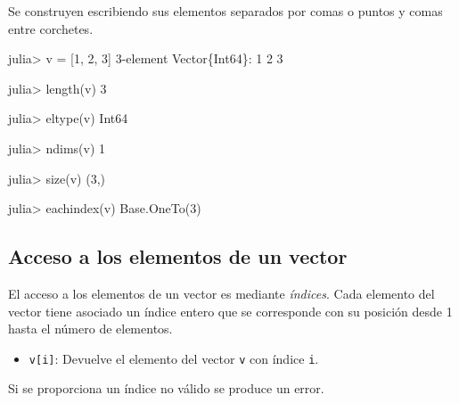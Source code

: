 \documentclass[
  letterpaper,
  DIV=11,
  numbers=noendperiod]{scrreprt}
\newenvironment{Shaded}{\begin{snugshade}}{\end{snugshade}}
\newcommand{\BuiltInTok}[1]{\textcolor[rgb]{0.00,0.23,0.31}{#1}}
\newcommand{\DataTypeTok}[1]{\textcolor[rgb]{0.68,0.00,0.00}{#1}}
\newcommand{\FloatTok}[1]{\textcolor[rgb]{0.68,0.00,0.00}{#1}}
\newcommand{\FunctionTok}[1]{\textcolor[rgb]{0.28,0.35,0.67}{#1}}
\newcommand{\NormalTok}[1]{\textcolor[rgb]{0.00,0.23,0.31}{#1}}
\newcommand{\OperatorTok}[1]{\textcolor[rgb]{0.37,0.37,0.37}{#1}}
\providecommand{\tightlist}{%
  \setlength{\itemsep}{0pt}\setlength{\parskip}{0pt}}\usepackage{longtable,booktabs,array}
\begin{document}
Se construyen escribiendo sus elementos separados por comas o puntos y
comas entre corchetes.

\begin{Shaded}
\begin{Highlighting}[]
\NormalTok{julia}\OperatorTok{\textgreater{}}\NormalTok{ v }\OperatorTok{=}\NormalTok{ [}\FloatTok{1}\NormalTok{, }\FloatTok{2}\NormalTok{, }\FloatTok{3}\NormalTok{]}
\FloatTok{3}\OperatorTok{{-}}\NormalTok{element }\DataTypeTok{Vector}\NormalTok{\{}\DataTypeTok{Int64}\NormalTok{\}}\OperatorTok{:}
 \FloatTok{1}
 \FloatTok{2}
 \FloatTok{3}

\NormalTok{julia}\OperatorTok{\textgreater{}} \FunctionTok{length}\NormalTok{(v)}
\FloatTok{3}

\NormalTok{julia}\OperatorTok{\textgreater{}} \FunctionTok{eltype}\NormalTok{(v)}
\DataTypeTok{Int64}

\NormalTok{julia}\OperatorTok{\textgreater{}} \FunctionTok{ndims}\NormalTok{(v)}
\FloatTok{1}

\NormalTok{julia}\OperatorTok{\textgreater{}} \FunctionTok{size}\NormalTok{(v)}
\NormalTok{(}\FloatTok{3}\NormalTok{,)}

\NormalTok{julia}\OperatorTok{\textgreater{}} \FunctionTok{eachindex}\NormalTok{(v)}
\BuiltInTok{Base}\NormalTok{.}\FunctionTok{OneTo}\NormalTok{(}\FloatTok{3}\NormalTok{)}
\end{Highlighting}
\end{Shaded}

\hypertarget{acceso-a-los-elementos-de-un-vector}{%
\subsection{Acceso a los elementos de un
vector}\label{acceso-a-los-elementos-de-un-vector}}

El acceso a los elementos de un vector es mediante \emph{índices}. Cada
elemento del vector tiene asociado un índice entero que se corresponde
con su posición desde 1 hasta el número de elementos.

\begin{itemize}
\tightlist
\item
  \texttt{v{[}i{]}}: Devuelve el elemento del vector \texttt{v} con
  índice \texttt{i}.
\end{itemize}

\begin{tcolorbox}[enhanced jigsaw, colbacktitle=quarto-callout-warning-color!10!white, coltitle=black, opacityback=0, opacitybacktitle=0.6, bottomtitle=1mm, leftrule=.75mm, toprule=.15mm, bottomrule=.15mm, toptitle=1mm, breakable, colframe=quarto-callout-warning-color-frame, colback=white, rightrule=.15mm, titlerule=0mm, title=\textcolor{quarto-callout-warning-color}{\faExclamationTriangle}\hspace{0.5em}{Warning}, arc=.35mm, left=2mm]
Si se proporciona un índice no válido se produce un error.
\end{tcolorbox}
\end{document}
